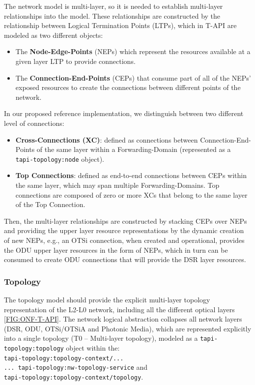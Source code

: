 \documentclass[a4paper,fleqn]{cas-dc}
\begin{document}
The network model is multi-layer, so it is needed to establish multi-layer relationships into the model. These relationships are constructed by the relationship between Logical Termination Points (LTPs), which in T-API are modeled as two different objects: 
\begin{itemize}
    \item The \textbf{Node-Edge-Points} (NEPs) which represent the resources available at a given layer LTP to provide connections.
    \item The \textbf{Connection-End-Points} (CEPs) that consume part of all of the NEPs’ exposed resources to create the connections between different points of the network.
\end{itemize}

In our proposed reference implementation, we distinguish between two different level of connections:

\begin{itemize}
    \item \textbf{Cross-Connections (XC)}: defined as connections between Connection-End-Points of the same layer within a Forwarding-Domain (represented as a\\ \texttt{tapi-topology:node} object). 
    \item \textbf{Top Connections}: defined as end-to-end connections between CEPs within the same layer, which may span multiple Forwarding-Domains. Top connections are composed of zero or more XCs that belong to the same layer of the Top Connection.
\end{itemize}

Then, the multi-layer relationships are constructed by stacking CEPs over NEPs and providing the upper layer resource representations by the dynamic creation of new NEPs, e.g., an OTSi connection, when created and operational, provides the ODU upper layer resources in the form of NEPs, which in turn can be consumed to create ODU connections that will provide the DSR layer resources.

\subsubsection{Topology}
\label{subsection:OPTopo}

The topology model should provide the explicit multi-layer topology representation of the L2-L0 network, including all the different optical layers \cref{FIG:ONF-T-API}. The network logical abstraction collapses all network layers (DSR, ODU, OTSi/OTSiA and Photonic Media), which are represented explicitly into a single topology (T0 – Multi-layer topology), modeled as a \texttt{tapi-topology:topology} object within the: \\
\texttt{tapi-topology:topology-context/... \\
... tapi-topology:nw-topology-service} and \\ \texttt{tapi-topology:topology-context/topology}. 
\end{document}
